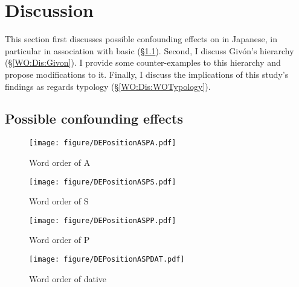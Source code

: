 \section{Discussion}\label{WODiscussion}

This section first discusses possible confounding effects on  in Japanese,
in particular in association with basic  (\S \ref{WO:Dis:Confounding}).
Second,
I discuss Giv{\'{o}}n's  hierarchy (\S \ref{WO:Dis:Givon}).
I provide some counter-examples to this hierarchy and
propose modifications to it.
Finally, 
I discuss the implications of this study's findings as regards  typology (\S \ref{WO:Dis:WOTypology}).



\subsection{Possible confounding effects}\label{WO:Dis:Confounding}

\begin{figure}
	\begin{center}
	\texttt{[image: figure/DEPositionASPA.pdf]}
	\caption{Word order of A}
	\label{DEPositionASPAF}
	\end{center}
\end{figure}
\begin{figure}
	\begin{center}
	\texttt{[image: figure/DEPositionASPS.pdf]}
	\caption{Word order of S}
	\label{DEPositionASPSF}
	\end{center}
\end{figure}
\begin{figure}
	\begin{center}
	\texttt{[image: figure/DEPositionASPP.pdf]}
	\caption{Word order of P}
	\label{DEPositionASPPF}
	\end{center}
\end{figure}
\begin{figure}
	\begin{center}
	\texttt{[image: figure/DEPositionASPDAT.pdf]}
	\caption{Word order of dative}
	\label{DEPositionASPDATF}
	\end{center}
\end{figure}



